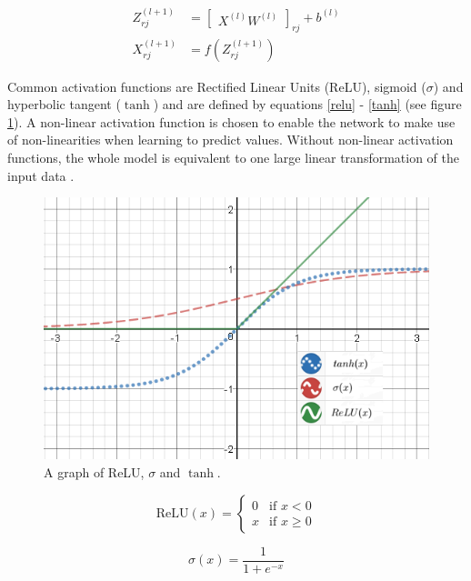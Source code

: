 \documentclass[a4paper, twoside]{article}
\begin{document}
\begin{align}
Z_{rj}^{(l+1)} & = \begin{bmatrix}
X^{(l)}W^{(l)}
\end{bmatrix}_{rj}+b^{(l)} \\
X_{rj}^{(l+1)} & = f(Z_{rj}^{(l+1)})
\end{align}

Common activation functions are Rectified Linear Units (ReLU), sigmoid ($\sigma$) and hyperbolic tangent ($\tanh$) and are defined by equations \eqref{relu} - \eqref{tanh} (see figure \ref{activation_function}). A non-linear activation function is chosen to enable the network to make use of non-linearities when learning to predict values. Without non-linear activation functions, the whole model is equivalent to one large linear transformation of the input data \cite{cs231n}.
\\
\begin{figure}[h]
	\centering
  		\includegraphics[scale=0.73]{activationfunction.png}
  	\caption{A graph of ReLU, $\sigma$ and $\tanh$.} \label{activation_function}
\end{figure}

\begin{equation}\label{relu}
\mbox{ReLU}{(x)} = \begin{cases} 
			0 & \mbox{if } x < 0 \\ 
			x & \mbox{if } x \geq 0 
		\end{cases}
\end{equation}

\begin{equation}\label{sigmoid}
\sigma(x) = \frac{1}{1+e^{-x}}
\end{equation}
\end{document}
